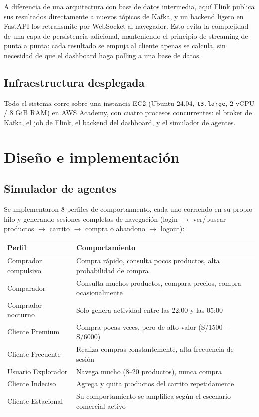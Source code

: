\documentclass[11pt,a4paper]{article}
\begin{document}
A diferencia de una arquitectura con base de datos intermedia, aquí Flink
publica sus resultados directamente a nuevos tópicos de Kafka, y un
backend ligero en FastAPI los retransmite por WebSocket al navegador. Esto
evita la complejidad de una capa de persistencia adicional, manteniendo
el principio de streaming de punta a punta: cada resultado se empuja al
cliente apenas se calcula, sin necesidad de que el dashboard haga polling
a una base de datos.

\subsection{Infraestructura desplegada}
Todo el sistema corre sobre una instancia EC2 (Ubuntu 24.04, \texttt{t3.large},
2 vCPU / 8 GiB RAM) en AWS Academy, con cuatro procesos concurrentes:
el broker de Kafka, el job de Flink, el backend del dashboard, y el
simulador de agentes.

\section{Dise\~no e implementaci\'on}

\subsection{Simulador de agentes}

Se implementaron 8 perfiles de comportamiento, cada uno corriendo en su
propio hilo y generando sesiones completas de navegación (login
$\rightarrow$ ver/buscar productos $\rightarrow$ carrito
$\rightarrow$ compra o abandono $\rightarrow$ logout):

\begin{center}
\begin{longtable}{@{}p{3.2cm}p{9.5cm}@{}}
\toprule
\textbf{Perfil} & \textbf{Comportamiento} \\
\midrule
\endhead
Comprador compulsivo & Compra rápido, consulta pocos productos, alta probabilidad de compra \\
Comparador & Consulta muchos productos, compara precios, compra ocasionalmente \\
Comprador nocturno & Solo genera actividad entre las 22:00 y las 05:00 \\
Cliente Premium & Compra pocas veces, pero de alto valor (S/1500 -- S/6000) \\
Cliente Frecuente & Realiza compras constantemente, alta frecuencia de sesión \\
Usuario Explorador & Navega mucho (8--20 productos), nunca compra \\
Cliente Indeciso & Agrega y quita productos del carrito repetidamente \\
Cliente Estacional & Su comportamiento se amplifica según el escenario comercial activo \\
\bottomrule
\end{longtable}
\end{center}
\end{document}

